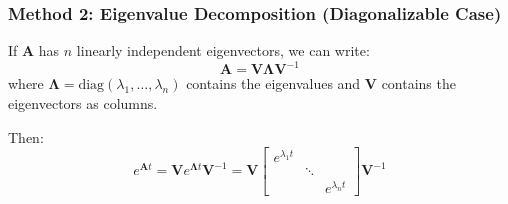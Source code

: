 \subsubsection{Method 2: Eigenvalue Decomposition (Diagonalizable Case)}

If $\mathbf{A}$ has $n$ linearly independent eigenvectors, we can write:
\begin{equation}
\mathbf{A} = \mathbf{V}\boldsymbol{\Lambda}\mathbf{V}^{-1}
\end{equation}
where $\boldsymbol{\Lambda} = \text{diag}(\lambda_1, \ldots, \lambda_n)$ contains the eigenvalues and $\mathbf{V}$ contains the eigenvectors as columns.

Then:
\begin{equation}
e^{\mathbf{A}t} = \mathbf{V}e^{\boldsymbol{\Lambda}t}\mathbf{V}^{-1} = \mathbf{V}\begin{bmatrix} e^{\lambda_1 t} & & \\ & \ddots & \\ & & e^{\lambda_n t} \end{bmatrix}\mathbf{V}^{-1}
\label{eq:exp_eigen}
\end{equation}

